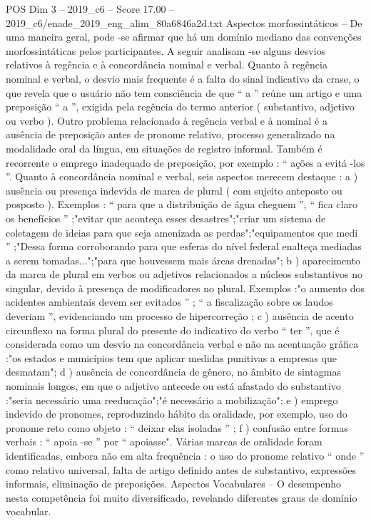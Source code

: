 \begin{textsample}{POS Dim 3 – 2019\_c6 – Score 17.00 – 2019\_c6/enade\_2019\_eng\_alim\_80a6846a2d.txt}
Aspectos morfossintáticos – De uma maneira geral, pode -se afirmar que há um domínio mediano das convenções morfossintáticas pelos participantes.
A seguir analisam -se alguns desvios relativos à regência e à concordância nominal e verbal.
Quanto à regência nominal e verbal, o desvio mais frequente é a falta do sinal indicativo da crase, o que revela que o usuário não tem consciência de que “ a ” reúne um artigo e uma preposição “ a ”, exigida pela regência do termo anterior ( substantivo, adjetivo ou verbo ).
Outro problema relacionado à regência verbal e à nominal é a ausência de preposição antes de pronome relativo, processo generalizado na modalidade oral da língua, em situações de registro informal.
Também é recorrente o emprego inadequado de preposição, por exemplo : “ ações a evitá -los ”.
Quanto à concordância nominal e verbal, seis aspectos merecem destaque : a ) ausência ou presença indevida de marca de plural ( com sujeito anteposto ou posposto ).
Exemplos : “ para que a distribuição de água cheguem ”, “ fica claro os benefícios ” ;"evitar que aconteça esses desastres";"criar um sistema de coletagem de ideias para que seja amenizada as perdas";"equipamentos que medi ” ;"Dessa forma corroborando para que esferas do nível federal enalteça mediadas a serem tomadas...";"para que houvessem mais áreas drenadas"; b ) aparecimento da marca de plural em verbos ou adjetivos relacionados a núcleos substantivos no singular, devido à presença de modificadores no plural.
Exemplos :"o aumento dos acidentes ambientais devem ser evitados ” ; “ a fiscalização sobre os laudos deveriam ”, evidenciando um processo de hipercorreção ; c ) ausência de acento circunflexo na forma plural do presente do indicativo do verbo “ ter ”, que é considerada como um desvio na concordância verbal e não na acentuação gráfica :"os estados e municípios tem que aplicar medidas punitivas a empresas que desmatam"; d ) ausência de concordância de gênero, no âmbito de sintagmas nominais longos, em que o adjetivo antecede ou está afastado do substantivo :"seria necessário uma reeducação";"é necessário a mobilização"; e ) emprego indevido de pronomes, reproduzindo hábito da oralidade, por exemplo, uso do pronome reto como objeto : “ deixar elas isoladas ” ; f ) confusão entre formas verbais : “ apoia -se ” por “ apoiasse".
Várias marcas de oralidade foram identificadas, embora não em alta frequência : o uso do pronome relativo “ onde ” como relativo universal, falta de artigo definido antes de substantivo, expressões informais, eliminação de preposições.
Aspectos Vocabulares – O desempenho nesta competência foi muito diversificado, revelando diferentes graus de domínio vocabular.

\end{textsample}
